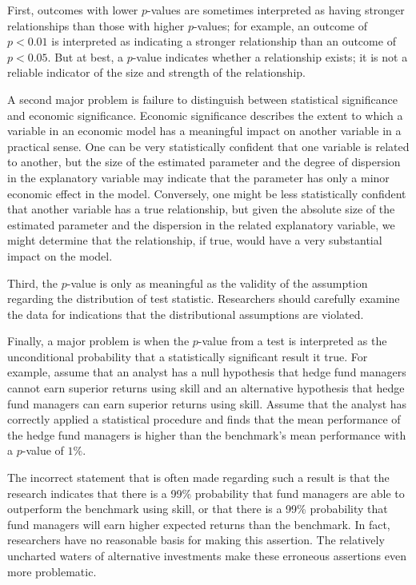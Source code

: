 \documentclass[11pt]{article}
\begin{document}
First, outcomes with lower $p$-values are sometimes interpreted as having stronger relationships than those with higher $p$-values; for example, an outcome of $p<0.01$ is interpreted as indicating a stronger relationship than an outcome of $p<0.05$. But at best, a $p$-value indicates whether a relationship exists; it is not a reliable indicator of the size and strength of the relationship.

A second major problem is failure to distinguish between statistical significance and economic significance. Economic significance describes the extent to which a variable in an economic model has a meaningful impact on another variable in a practical sense. One can be very statistically confident that one variable is related to another, but the size of the estimated parameter and the degree of dispersion in the explanatory variable may indicate that the parameter has only a minor economic effect in the model. Conversely, one might be less statistically confident that another variable has a true relationship, but given the absolute size of the estimated parameter and the dispersion in the related explanatory variable, we might determine that the relationship, if true, would have a very substantial impact on the model.

Third, the $p$-value is only as meaningful as the validity of the assumption regarding the distribution of test statistic. Researchers should carefully examine the data for indications that the distributional assumptions are violated.

Finally, a major problem is when the $p$-value from a test is interpreted as the unconditional probability that a statistically significant result it true. For example, assume that an analyst has a null hypothesis that hedge fund managers cannot earn superior returns using skill and an alternative hypothesis that hedge fund managers can earn superior returns using skill. Assume that the analyst has correctly applied a statistical procedure and finds that the mean performance of the hedge fund managers is higher than the benchmark's mean performance with a $p$-value of $1 \%$.

The incorrect statement that is often made regarding such a result is that the research indicates that there is a 99\% probability that fund managers are able to outperform the benchmark using skill, or that there is a 99\% probability that fund managers will earn higher expected returns than the benchmark. In fact, researchers have no reasonable basis for making this assertion. The relatively uncharted waters of alternative investments make these erroneous assertions even more problematic.
\end{document}
